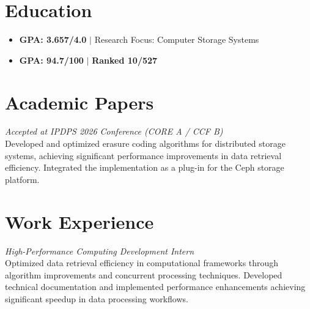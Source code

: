 \documentclass{resume}
\begin{document}



\section{Education}
\begin{itemize}
  \item \textbf{GPA: 3.657/4.0} $|$ Research Focus: Computer Storage Systems
\end{itemize}
\begin{itemize}
  \item \textbf{GPA: 94.7/100} $|$ \textbf{Ranked 10/527}
\end{itemize}

\section{Academic Papers}
\textit{Accepted at IPDPS 2026 Conference (CORE A / CCF B)}\\[0.5ex]
Developed and optimized erasure coding algorithms for distributed storage systems, achieving significant performance improvements in data retrieval efficiency. Integrated the implementation as a plug-in for the Ceph storage platform.

\section{Work Experience}
\textit{High-Performance Computing Development Intern}\\[0.5ex]
Optimized data retrieval efficiency in computational frameworks through algorithm improvements and concurrent processing techniques. Developed technical documentation and implemented performance enhancements achieving significant speedup in data processing workflows.
\end{document}
